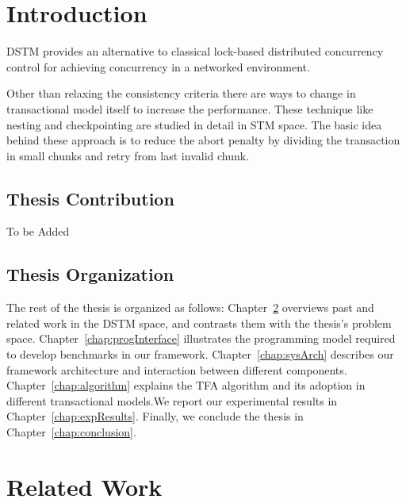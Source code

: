 \documentclass[12pt,english]{report}
\begin{document}
\chapter{Introduction}\label{chap:intro}

DSTM provides an alternative to classical lock-based distributed concurrency control for achieving concurrency in a networked environment. 

Other than relaxing the consistency criteria there are ways to change in transactional model itself to increase the performance. These technique like nesting and checkpointing are studied in detail in  STM space. The basic idea behind these approach is to reduce the abort penalty by dividing the transaction in small chunks and retry from last invalid chunk. 

\section{Thesis Contribution}

To be Added

\section{Thesis Organization}

The rest of the thesis is organized as follows: Chapter~\ref{chap:relWork} overviews past and related work in the DSTM space, and contrasts them with the thesis's problem space. Chapter~\ref{chap:progInterface} illustrates the programming model required to develop benchmarks in our framework. Chapter~\ref{chap:sysArch} describes our framework architecture and interaction between different components. Chapter~\ref{chap:algorithm} explains the TFA algorithm and its adoption in different transactional models.We report our experimental results in Chapter~\ref{chap:expResults}. Finally, we conclude the thesis in Chapter~\ref{chap:conclusion}.

\chapter{Related Work}\label{chap:relWork}
\end{document}
